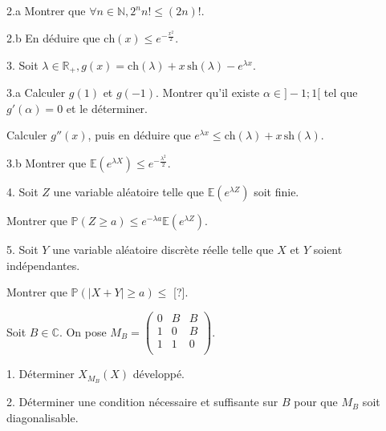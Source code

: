 \vspace{5pt}
2.a Montrer que $\forall n \in \mathbb{N}, 2^n n! \leqslant (2n)!$.

\vspace{5pt}
2.b En déduire que $\mathrm{ch}(x) \leqslant e^{-\frac {x^2} {2}}$.

\vspace{5pt}
3. Soit $\lambda \in \mathbb{R}_+, g(x) = \mathrm{ch}(\lambda) + x \, \mathrm{sh}(\lambda) - e^{\lambda x}$.

\vspace{5pt}
\quad 3.a Calculer $g(1)$ et $g(-1)$. Montrer qu'il existe $\alpha \in \rbrack -1;1 \lbrack$
tel que $g'(\alpha) = 0$ et le déterminer.

\quad Calculer $g''(x)$, puis en déduire que $e^{\lambda x} \leqslant \mathrm{ch}(\lambda) + x \, \mathrm{sh}(\lambda)$.

\vspace{5pt}
\quad 3.b Montrer que $\mathbb{E}\left(e^{\lambda X}\right) \leqslant e^{- \frac {\lambda^2} {2}}$.

\vspace{5pt}
4. Soit $Z$ une variable aléatoire telle que $\mathbb{E}\left(e^{\lambda Z}\right)$ soit finie.

Montrer que $\mathbb{P}\left(Z \geqslant a\right) \leqslant e^{-\lambda a} \mathbb{E}\left(e^{\lambda Z}\right)$.

\vspace{5pt}
5. Soit $Y$ une variable aléatoire discrète réelle telle que $X$ et $Y$ soient indépendantes.

Montrer que $\mathbb{P}(| X + Y| \geqslant a) \leqslant$ [?].



\subetoiles



\noindent Soit $B \in \mathbb{C}$. On pose $M_B = 
\begin{pmatrix}
  0 & B & B \\
  1 & 0 & B \\
  1 & 1 & 0 \\
\end{pmatrix}$.

\vspace{5pt}
1. Déterminer $X_{M_B}(X)$ développé.

\vspace{5pt}
2. Déterminer une condition nécessaire et suffisante sur $B$ pour que $M_B$ soit \\ diagonalisable.



